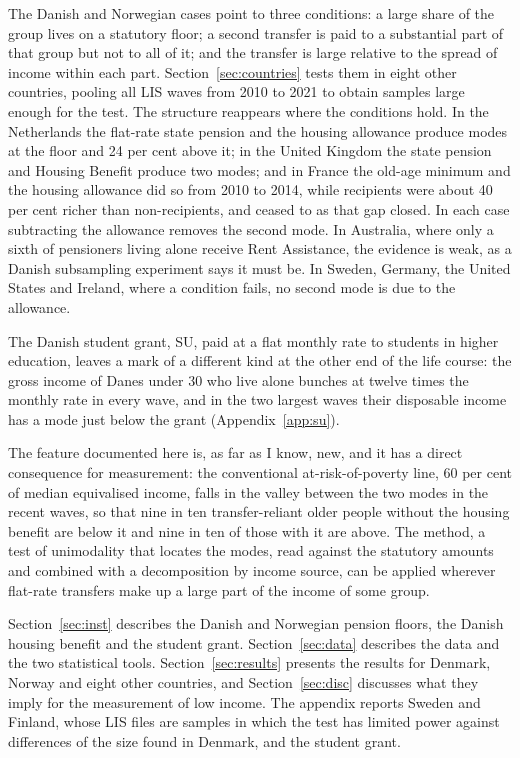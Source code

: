 The Danish and Norwegian cases point to three conditions: a large share of the group lives on a statutory floor; a second transfer is paid to a substantial part of that group but not to all of it; and the transfer is large relative to the spread of income within each part. Section~\ref{sec:countries} tests them in eight other countries, pooling all LIS waves from 2010 to 2021 to obtain samples large enough for the test. The structure reappears where the conditions hold. In the Netherlands the flat-rate state pension and the housing allowance produce modes at the floor and 24 per cent above it; in the United Kingdom the state pension and Housing Benefit produce two modes; and in France the old-age minimum and the housing allowance did so from 2010 to 2014, while recipients were about 40 per cent richer than non-recipients, and ceased to as that gap closed. In each case subtracting the allowance removes the second mode. In Australia, where only a sixth of pensioners living alone receive Rent Assistance, the evidence is weak, as a Danish subsampling experiment says it must be. In Sweden, Germany, the United States and Ireland, where a condition fails, no second mode is due to the allowance.

The Danish student grant, SU, paid at a flat monthly rate to students in higher education, leaves a mark of a different kind at the other end of the life course: the gross income of Danes under 30 who live alone bunches at twelve times the monthly rate in every wave, and in the two largest waves their disposable income has a mode just below the grant (Appendix~\ref{app:su}).

The feature documented here is, as far as I know, new, and it has a direct consequence for measurement: the conventional at-risk-of-poverty line, 60 per cent of median equivalised income, falls in the valley between the two modes in the recent waves, so that nine in ten transfer-reliant older people without the housing benefit are below it and nine in ten of those with it are above. The method, a test of unimodality that locates the modes, read against the statutory amounts and combined with a decomposition by income source, can be applied wherever flat-rate transfers make up a large part of the income of some group.

Section~\ref{sec:inst} describes the Danish and Norwegian pension floors, the Danish housing benefit and the student grant. Section~\ref{sec:data} describes the data and the two statistical tools. Section~\ref{sec:results} presents the results for Denmark, Norway and eight other countries, and Section~\ref{sec:disc} discusses what they imply for the measurement of low income. The appendix reports Sweden and Finland, whose LIS files are samples in which the test has limited power against differences of the size found in Denmark, and the student grant.
